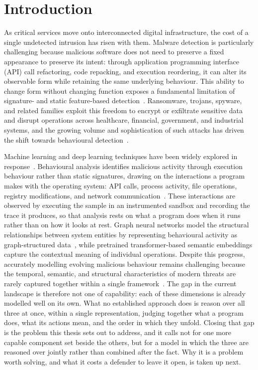 \documentclass[%
    BCOR=10mm,
    DIV=13,
    toc=bibliography,
    toc=listof,
    oneside,
    12pt,
]{scrbook}
\begin{document}
\setcapindent{0pt}

\chapter{Introduction}
\label{chap:introduction}

As critical services move onto interconnected digital infrastructure, the cost
of a single undetected intrusion has risen with them. Malware detection is
particularly challenging because malicious software does not need to preserve a
fixed appearance to preserve its intent: through application programming
interface (API) call refactoring, code repacking, and execution reordering, it
can alter its observable form while retaining the same underlying behaviour.
This ability to change form without changing function exposes a fundamental
limitation of signature- and static feature-based
detection~\cite{amer2025graphshield}. Ransomware, trojans, spyware, and related
families exploit this freedom to encrypt or exfiltrate sensitive data and
disrupt operations across healthcare, financial, government, and industrial
systems, and the growing volume and sophistication of such attacks has driven
the shift towards behavioural detection~\cite{bilot2023intrusion}.

Machine learning and deep learning techniques have been widely explored in
response~\cite{bilot2024survey}. Behavioural analysis identifies malicious
activity through execution behaviour rather than static signatures, drawing on
the interactions a program makes with the operating system: API calls, process
activity, file operations, registry modifications, and network
communication~\cite{mimura2022nlp}. These interactions are observed by
executing the sample in an instrumented sandbox and recording the trace it
produces, so that analysis rests on what a program does when it runs rather
than on how it looks at rest. Graph neural networks model the structural
relationships between system entities by representing behavioural activity as
graph-structured data~\cite{hamilton2017graphsage, wang2019matchgnet}, while
pretrained transformer-based semantic embeddings capture the contextual meaning
of individual operations. Despite this progress, accurately modelling evolving
malicious behaviour remains challenging because the temporal, semantic, and
structural characteristics of modern threats are rarely captured together
within a single framework~\cite{bilot2024survey}. The gap in the current
landscape is therefore not one of capability: each of these dimensions is
already modelled well on its own. What no established approach does is reason
over all three at once, within a single representation, judging together what a
program does, what its actions mean, and the order in which they unfold.
Closing that gap is the problem this thesis sets out to address, and it calls
not for one more capable component set beside the others, but for a model in
which the three are reasoned over jointly rather than combined after the fact.
Why it is a problem worth solving, and what it costs a defender to leave it
open, is taken up next.
\end{document}
